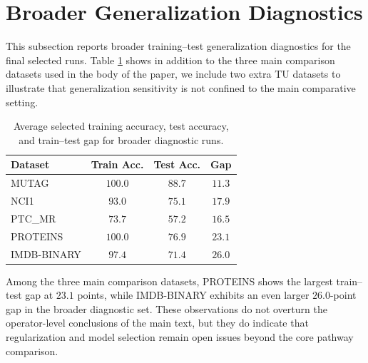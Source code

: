 \section{Broader Generalization Diagnostics}
\label{app:generalization}

This subsection reports broader training--test generalization diagnostics for the final selected runs. Table \ref{tab:app-gap} shows in addition to the three main comparison datasets used in the body of the paper, we include two extra TU datasets to illustrate that generalization sensitivity is not confined to the main comparative setting.

\begin{table}[t]
\centering
\caption{Average selected training accuracy, test accuracy, and train--test gap for broader diagnostic runs.}
\label{tab:app-gap}
\begin{tabular*}{0.85\columnwidth}{@{\extracolsep{\fill}}lccc@{}}
    \toprule
    \textbf{Dataset} & \textbf{Train Acc.} & \textbf{Test Acc.} & \textbf{Gap} \\
    \midrule
    MUTAG & $100.0$ & $88.7$ & $11.3$ \\
    NCI1 & $93.0$ & $75.1$ & $17.9$ \\
    PTC\_MR & $73.7$ & $57.2$ & $16.5$ \\
    PROTEINS & $100.0$ & $76.9$ & $23.1$ \\
    IMDB-BINARY & $97.4$ & $71.4$ & $26.0$ \\
    \bottomrule
\end{tabular*}
\end{table}

Among the three main comparison datasets, PROTEINS shows the largest train--test gap at $23.1$ points, while IMDB-BINARY exhibits an even larger $26.0$-point gap in the broader diagnostic set. These observations do not overturn the operator-level conclusions of the main text, but they do indicate that regularization and model selection remain open issues beyond the core pathway comparison.
